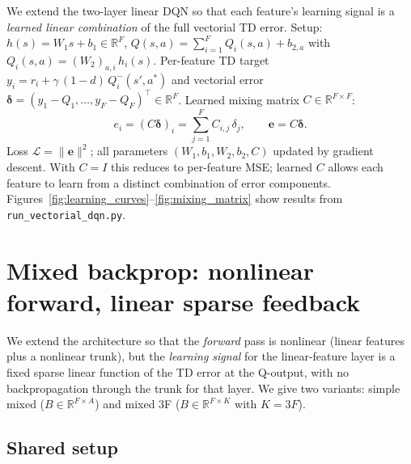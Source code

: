 \documentclass[11pt]{article}
\begin{document}
We extend the two-layer linear DQN so that each feature's learning signal is a \emph{learned linear combination} of the full vectorial TD error. Setup: $h(s) = W_1 s + b_1 \in \mathbb{R}^F$, $Q(s,a) = \sum_{i=1}^F Q_i(s,a) + b_{2,a}$ with $Q_i(s,a) = (W_2)_{a,i}\, h_i(s)$. Per-feature TD target $y_i = r_i + \gamma\,(1-d)\, Q_i^-(s', a^*)$ and vectorial error $\boldsymbol{\delta} = (y_1 - Q_1, \ldots, y_F - Q_F)^\top \in \mathbb{R}^F$. Learned mixing matrix $C \in \mathbb{R}^{F \times F}$:
\begin{equation}
e_i = (C \boldsymbol{\delta})_i = \sum_{j=1}^F C_{i,j}\, \delta_j, \qquad \mathbf{e} = C\boldsymbol{\delta}.
\end{equation}
Loss $\mathcal{L} = \|\mathbf{e}\|^2$; all parameters $(W_1, b_1, W_2, b_2, C)$ updated by gradient descent. With $C = I$ this reduces to per-feature MSE; learned $C$ allows each feature to learn from a distinct combination of error components. Figures~\ref{fig:learning_curves}--\ref{fig:mixing_matrix} show results from \texttt{run\_vectorial\_dqn.py}.

\section{Mixed backprop: nonlinear forward, linear sparse feedback}

We extend the architecture so that the \emph{forward} pass is nonlinear (linear features plus a nonlinear trunk), but the \emph{learning signal} for the linear-feature layer is a fixed sparse linear function of the TD error at the Q-output, with no backpropagation through the trunk for that layer. We give two variants: simple mixed ($B \in \mathbb{R}^{F \times A}$) and mixed 3F ($B \in \mathbb{R}^{F \times K}$ with $K=3F$).

\subsection{Shared setup}
\end{document}
